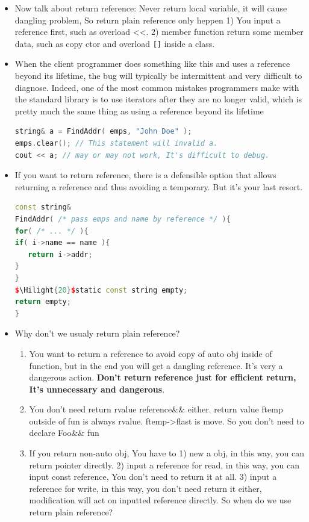 \documentclass[a4paper,12pt,twoside]{book}
\newcommand{\Hilight}[1]{\makebox[0pt][l]{\color{yellow}\rule[-3pt]{#1em}{11pt}}}
\begin{document}
\begin{itemize}
\item Now talk about return reference: Never return local variable, it will cause dangling problem, So return plain reference only heppen 1) You input a reference first, such as overload <<. 2) member function return some member data, such as copy ctor and overload \verb=[]= inside a class.

\item  When the client programmer does something like this and uses a reference beyond its lifetime, the bug will typically be intermittent and very difficult to diagnose. Indeed, one of the most common mistakes programmers make with the standard library is to use iterators after they are no longer valid, which is pretty much the same thing as using a reference beyond its lifetime

\begin{lstlisting}[frame=single, language=c++, mathescape=true]
string& a = FindAddr( emps, "John Doe" );
emps.clear(); // This statement will invalid a.
cout << a; // may or may not work, It's difficult to debug.
\end{lstlisting}

\item If you want to return reference,  there is a defensible option that allows returning a reference and thus avoiding a temporary. But it's your last resort.
\begin{lstlisting}[frame=single, language=c++, mathescape=true]
const string&
FindAddr( /* pass emps and name by reference */ ){
for( /* ... */ ){
if( i->name == name ){
   return i->addr;
}
}
$\Hilight{20}$static const string empty;
return empty;
}
\end{lstlisting}

\item Why don't we usualy return plain reference?
\begin{enumerate}
\item You want to return a reference to avoid copy of auto obj inside of function,  but in the end you will get a dangling reference. It's very a dangerous action. \textbf{Don't return reference just for efficient return, It's unnecessary and dangerous}.

\item You don't need return rvalue reference\&\& either.  return value ftemp outside of fun is always rvalue. ftemp->flast is move.  So you don't need to declare Foo\&\& fun

\item If you return non-auto obj, You have to 1) new a obj, in this way, you can return pointer directly. 2) input a reference for read, in this way, you can input const reference, You don't need to return it at all. 3) input a reference for write, in this way, you don't need return it either, modification will act on inputted reference directly. So when do we use return plain reference?
\end{enumerate}


\end{itemize}
\end{document}

